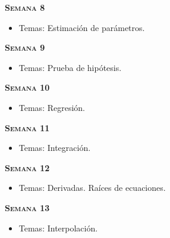 \documentclass[letterpaper,10pt,onecolumn]{article}
\begin{document}
\noindent\textbf{\textsc{Semana 8}}\\[-0.5cm]
\begin{itemize}
\item Temas: Estimaci\'on de par\'ametros.
\\[-0.6cm] 
\end{itemize}

\noindent\textbf{\textsc{Semana 9}}\\[-0.5cm]
\begin{itemize}
\item Temas: Prueba de hip\'otesis.\\[-0.6cm]   
\end{itemize}


\noindent\textbf{\textsc{Semana 10}}\\[-0.5cm]
\begin{itemize}
\item Temas: Regresi\'on.\\[-0.6cm]
\end{itemize}

\noindent\textbf{\textsc{Semana 11}}\\[-0.5cm]
\begin{itemize}
\item Temas: Integraci\'on. \\[-0.6cm]
\end{itemize}

\noindent\textbf{\textsc{Semana 12}}\\[-0.5cm]
\begin{itemize}
\item Temas: Derivadas. Ra\'ices de ecuaciones. \\[-0.6cm]
\end{itemize}

\noindent\textbf{\textsc{Semana 13}}\\[-0.5cm]
\begin{itemize}
\item Temas: Interpolación. \\[-0.6cm]
\end{itemize}
\end{document}
